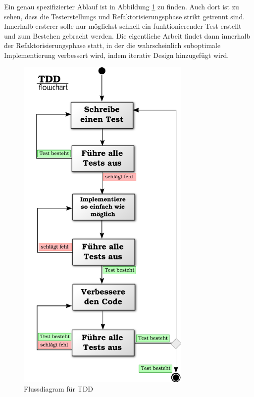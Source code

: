   
  Ein genau spezifizierter Ablauf ist in Abbildung \ref{fig:tddflow} zu finden. Auch dort ist zu sehen, dass die Testerstellungs und Refaktorisierungsphase strikt getrennt sind. Innerhalb ersterer solle nur möglichst schnell ein funktionierender Test erstellt und zum Bestehen gebracht werden. Die eigentliche Arbeit findet dann innerhalb der Refaktorisierungsphase statt, in der die wahrscheinlich suboptimale Implementierung verbessert wird, indem iterativ Design hinzugefügt wird.
  \begin{figure}[hp]
 \centering
 \includegraphics[width=0.75\textwidth]{./diagrams/tdd-flowchart.pdf}
 \caption{Flussdiagram für TDD}
 \label{fig:tddflow}
\end{figure}


